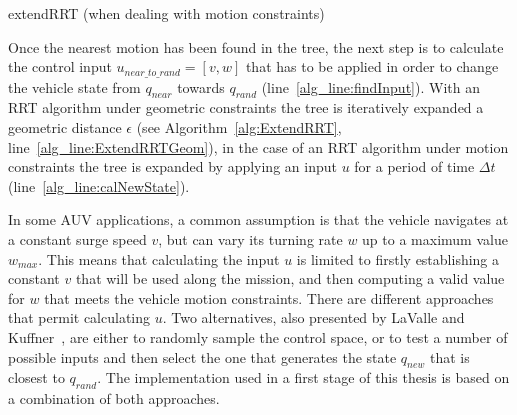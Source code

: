 \begin{algorithm}[htbp]
\DontPrintSemicolon

	
\caption[extendRRT when dealing with motion constraints.]
{extendRRT (when dealing with motion constraints)}
\label{alg:ExtendRRTDiffConstr}
\end{algorithm}

Once the nearest motion has been found in the tree, the next step is to
calculate the control input $u_{near\_ to\_rand}=\left[v, w\right]$ that has to
be applied in order to change the vehicle state from $q_{near}$ towards
$q_{rand}$ (line~\ref{alg_line:findInput}). With an \ac{RRT} algorithm under
geometric constraints the tree is iteratively expanded a geometric distance
$\epsilon$ (see Algorithm~\ref{alg:ExtendRRT},
line~\ref{alg_line:ExtendRRTGeom}), in the case of an \ac{RRT} algorithm under
motion constraints the tree is expanded by applying an input $u$ for a period of
time $\Delta t$ (line~\ref{alg_line:calNewState}).

In some \ac{AUV} applications, a common assumption is that the vehicle navigates
at a constant surge speed $v$, but can vary its turning rate $w$ up to a maximum
value $w_{max}$. This means that calculating the input $u$ is limited to firstly
establishing a constant $v$ that will be used along the mission, and then
computing a valid value for $w$ that meets the vehicle motion constraints. There
are different approaches that permit calculating $u$. Two alternatives, also
presented by LaValle and Kuffner~\cite{LaValle2001}, are either to randomly
sample the control space, or to test a number of possible inputs and then select
the one that generates the state $q_{new}$ that is closest to $q_{rand}$. The
implementation used in a first stage of this thesis is based on a combination of
both approaches.

